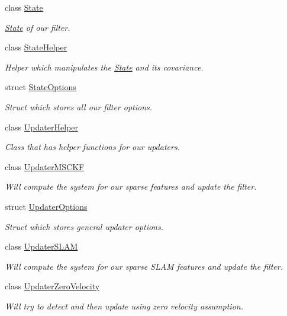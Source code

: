 \begin{DoxyCompactItemize}
class \hyperlink{classov__msckf_1_1State}{State}
\begin{DoxyCompactList}\small\item\em \hyperlink{classov__msckf_1_1State}{State} of our filter. \end{DoxyCompactList}\item 
class \hyperlink{classov__msckf_1_1StateHelper}{State\+Helper}
\begin{DoxyCompactList}\small\item\em Helper which manipulates the \hyperlink{classov__msckf_1_1State}{State} and its covariance. \end{DoxyCompactList}\item 
struct \hyperlink{structov__msckf_1_1StateOptions}{State\+Options}
\begin{DoxyCompactList}\small\item\em Struct which stores all our filter options. \end{DoxyCompactList}\item 
class \hyperlink{classov__msckf_1_1UpdaterHelper}{Updater\+Helper}
\begin{DoxyCompactList}\small\item\em Class that has helper functions for our updaters. \end{DoxyCompactList}\item 
class \hyperlink{classov__msckf_1_1UpdaterMSCKF}{Updater\+M\+S\+C\+KF}
\begin{DoxyCompactList}\small\item\em Will compute the system for our sparse features and update the filter. \end{DoxyCompactList}\item 
struct \hyperlink{structov__msckf_1_1UpdaterOptions}{Updater\+Options}
\begin{DoxyCompactList}\small\item\em Struct which stores general updater options. \end{DoxyCompactList}\item 
class \hyperlink{classov__msckf_1_1UpdaterSLAM}{Updater\+S\+L\+AM}
\begin{DoxyCompactList}\small\item\em Will compute the system for our sparse S\+L\+AM features and update the filter. \end{DoxyCompactList}\item 
class \hyperlink{classov__msckf_1_1UpdaterZeroVelocity}{Updater\+Zero\+Velocity}
\begin{DoxyCompactList}\small\item\em Will try to {\itshape detect} and then update using zero velocity assumption. \end{DoxyCompactList}\item 

\end{DoxyCompactItemize}
